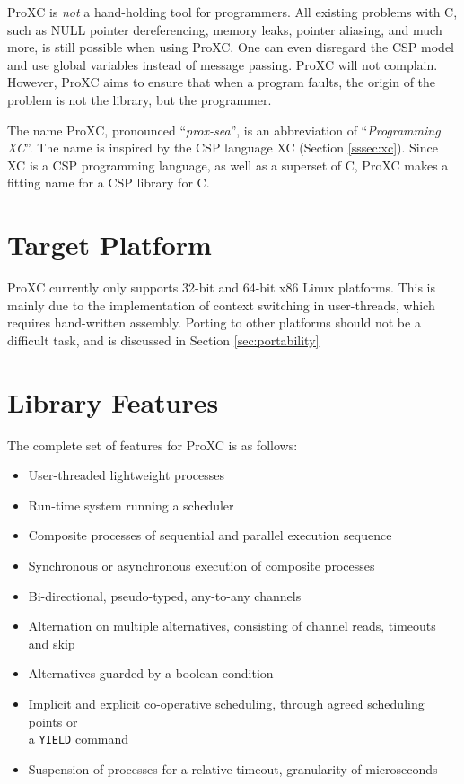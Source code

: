ProXC is \textit{not} a hand\hyp{}holding tool for programmers. All existing problems with C, such as NULL pointer dereferencing, memory leaks, pointer aliasing, and much more, is still possible when using ProXC. One can even disregard the CSP model and use global variables instead of message passing. ProXC will not complain. However, ProXC aims to ensure that when a program faults, the origin of the problem is not the library, but the programmer.

The name ProXC, pronounced ``\textit{prox\hyp{}sea}'', is an abbreviation of ``\textit{Programming XC}''. The name is inspired by the CSP language XC (Section \ref{sssec:xc}). Since XC is a CSP programming language, as well as a superset of C, ProXC makes a fitting name for a CSP library for C. 

\section{Target Platform}
\label{sec:proxc_target_platform}

ProXC currently only supports 32\hyp{}bit and 64\hyp{}bit x86 Linux platforms. This is mainly due to the implementation of context switching in user\hyp{}threads, which requires hand\hyp{}written assembly. Porting to other platforms should not be a difficult task, and is discussed in Section \ref{sec:portability}

\section{Library Features}
\label{sec:proxc_features}

The complete set of features for ProXC is as follows:
\begin{itemize}
    \setlength\itemsep{0em}
    \item User\hyp{}threaded lightweight processes
    \item Run\hyp{}time system running a scheduler
    \item Composite processes of sequential and parallel execution sequence
    \item Synchronous or asynchronous execution of composite processes
    \item Bi\hyp{}directional, pseudo\hyp{}typed, any\hyp{}to\hyp{}any channels
    \item Alternation on multiple alternatives, consisting of channel reads, timeouts and skip
    \item Alternatives guarded by a boolean condition
    \item Implicit and explicit co\hyp{}operative scheduling, through agreed scheduling points or\\ a \texttt{YIELD} command
    \item Suspension of processes for a relative timeout, granularity of microseconds
\end{itemize}


